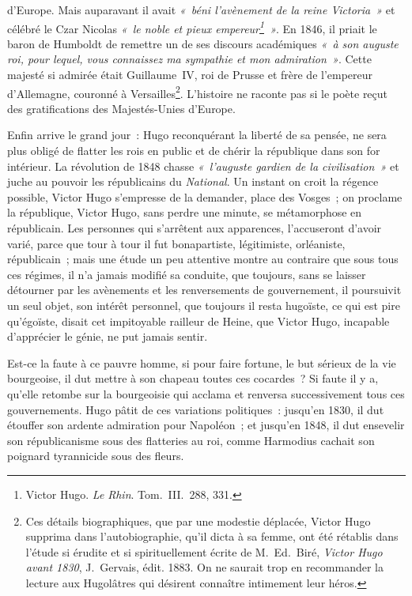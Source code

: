 \documentclass[french,twoside]{book} %
\begin{document}
\label{p24}d’Europe. Mais auparavant il avait \emph{« béni l’avènement de la reine Victoria »} et célébré le Czar Nicolas \emph{« le noble et pieux empereur\footnote{Victor Hugo. \emph{Le Rhin}. Tom. III. 288, 331.} »}. En 1846, il priait le baron de Humboldt de remettre un de ses discours académiques \emph{« à son auguste roi, pour lequel, vous connaissez ma sympathie et mon admiration »}. Cette majesté si admirée était Guillaume IV, roi de Prusse et frère de l’empereur d’Allemagne, couronné à Versailles\footnote{Ces détails biographiques, que par une modestie déplacée, Victor Hugo supprima dans l’autobiographie, qu’il dicta à sa femme, ont été rétablis dans l’étude si érudite et si spirituellement écrite de M. Ed. Biré, \emph{Victor Hugo avant 1830}, J. Gervais, édit. 1883. On ne saurait trop en recommander la lecture aux Hugolâtres qui désirent connaître intimement leur héros.}. L’histoire ne raconte pas si le poète reçut des gratifications des Majestés-Unies d’Europe.\par
Enfin arrive le grand jour : Hugo reconquérant la liberté de sa pensée, ne sera plus obligé de flatter les rois en public et de chérir la république dans son for intérieur. La révolution de 1848 chasse \emph{« l’auguste gardien de la civilisation »} et juche au pouvoir les républicains du \emph{National}. Un instant on croit la régence possible, Victor Hugo s’empresse de la demander, place des Vosges ; on proclame la république, Victor Hugo, sans perdre une minute, se métamorphose en républicain. Les personnes qui s’arrêtent aux apparences, l’accuseront d’avoir varié, parce que tour à tour il fut bonapartiste, légitimiste, orléaniste, républicain ; mais une étude un peu attentive montre au contraire que sous tous ces  
\label{p25}régimes, il n’a jamais modifié sa conduite, que toujours, sans se laisser détourner par les avènements et les renversements de gouvernement, il poursuivit un seul objet, son intérêt personnel, que toujours il resta hugoïste, ce qui est pire qu’égoïste, disait cet impitoyable railleur de Heine, que Victor Hugo, incapable d’apprécier le génie, ne put jamais sentir.\par
Est-ce la faute à ce pauvre homme, si pour faire fortune, le but sérieux de la vie bourgeoise, il dut mettre à son chapeau toutes ces cocardes ? Si faute il y a, qu’elle retombe sur la bourgeoisie qui acclama et renversa successivement tous ces gouvernements. Hugo pâtit de ces variations politiques : jusqu’en 1830, il dut étouffer son ardente admiration pour Napoléon ; et jusqu’en 1848, il dut ensevelir son républicanisme sous des flatteries au roi, comme Harmodius cachait son poignard tyrannicide sous des fleurs.\par
\end{document}
